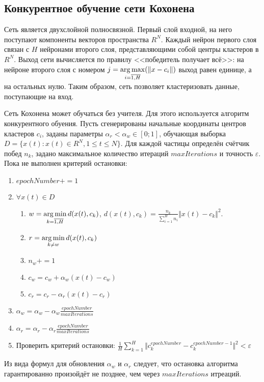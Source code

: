 \subsection{Конкурентное обучение сети Кохонена}
\label{subse:kohonen}
Сеть является двухслойной полносвязной. Первый слой входной, на него поступают компоненты
векторов пространства \(R^N\). Каждый нейрон первого слоя связан с \(H\) нейронами второго
слоя, представляющими собой центры кластеров в \(R^N\). Выход сети вычисляется по правилу
<<победитель получает всё>>: на нейроне второго слоя с номером
\(\displaystyle j=\operatorname*{arg\,max}_{i=\overline{1,H}}(\Vert x - c_i \Vert)\) выход равен единице, а на остальных нулю.
Таким образом, сеть позволяет кластеризовать данные, поступающие на вход.
\par
Сеть Кохонена может обучаться без учителя. Для этого используется алгоритм конкурентного
обуения. Пусть сгенерированы начальные координаты центров кластеров \(c_i\), заданы
параметры \(\alpha_r < \alpha_w \in [0;1]\), обучающая выборка \(D=\{x(t):x(t)\in R^N, 1 \leqslant t \leqslant N\}\).
Для каждой частицы определён счётчик побед \(n_k\), задано максимальное количество итераций
\(maxIterations\) и точность \(\varepsilon\).
\newline
Пока не выполнен критерий остановки:
\begin{enumerate}
  \item \(epochNumber+=1\)
  \item \(\forall x(t)\in D\)
    \begin{enumerate}
      \item \(\displaystyle w=\operatorname*{arg\,min}_{k=\overline{1,H}}d(x(t),c_k)\), \(\displaystyle d(x(t),c_k)=\frac{n_k}{\sum_{i=1}^{H}n_i}\Vert x(t)-c_k \Vert^2\).
      \item \(\displaystyle r=\operatorname*{arg\,min}_{k\neq w}d(x(t),c_k)\)
      \item \(n_w +=1\)
      \item \(c_w=c_w+\alpha_w (x(t)-c_w)\)
      \item \(c_r=c_r-\alpha_r (x(t)-c_r)\)
    \end{enumerate}
  \item \(\displaystyle\alpha_w = \alpha_w - \alpha_w \frac{epochNumber}{maxIterations}\)
  \item \(\displaystyle\alpha_r = \alpha_r - \alpha_r \frac{epochNumber}{maxIterations}\)
  \item Проверить критерий остановки: \(\displaystyle\frac{1}{H}\sum_{k=1}^{H} \Vert c_k^{epochNumber} - c_k^{epochNumber-1} \Vert^2 < \varepsilon \)
\end{enumerate}
Из вида формул для обновления \(\alpha_w\) и \(\alpha_r\) следует, что остановка
алгоритма гарантированно произойдёт не позднее, чем через \(maxIterations\) итреаций.

